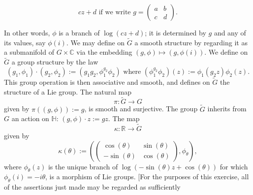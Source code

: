 \documentclass[reqno]{amsart} 
\begin{document}
\begin{homework}
\begin{enumerate}
\begin{itemize}
\begin{equation*}
        c z + d
        \text{ if we write }
        g = 
\begin{pmatrix}
          a & b \\
          c & d
        \end{pmatrix}
.
      \end{equation*}
    \end{itemize}
    In other words, $\phi$ is a branch of $\log(c z + d)$;
    it is determined by $g$ and any of its values, say $\phi(i)$.
    We may define on $\tilde{G}$ a smooth structure
    by regarding it as a submanifold of
    $G \times \mathbb{C}$
    via the embedding $(g,\phi) \mapsto (g,\phi(i))$.
    We define on $\tilde{G}$ a group structure
    by the law
    \begin{equation*}
      (g_1,\phi_1) \cdot (g_2,\phi_2)
      :=
      (g_1 g_2, \phi_1^{g_2} \phi_2)
      \text{ where }
      (\phi_1^{g_2} \phi_2)(z)
      :=
      \phi_1(g_2 z) \phi_2(z).
    \end{equation*}
    This group operation is then associative and smooth,
    and defines on $\tilde{G}$ the structure of a Lie group.
    The natural map
    \begin{equation*}
      \pi : \tilde{G} \rightarrow G
    \end{equation*}
    given by $\pi((g,\phi)) := g$,
    is smooth and surjective.
    The group $\tilde{G}$ inherits from $G$ an action on $\mathbb{H}$:
    $(g,\phi) \cdot z := g z$.
    The map
    \begin{equation*}
      \kappa : \mathbb{R} \rightarrow \tilde{G}
    \end{equation*}
    given
    by
    \begin{equation*}
      \kappa(\theta) :=
      (
      \begin{pmatrix}
        \cos(\theta) & \sin(\theta) \\
        -\sin(\theta) & \cos(\theta)
      \end{pmatrix}
,
      \phi_\theta),
    \end{equation*}
    where $\phi_\theta(z)$ is the unique branch
    of $\log(-\sin(\theta) z + \cos(\theta))$
    for which
    $\phi_\theta(i)
    = - i \theta$,
    is a morphism of Lie groups.
    [For the purposes of this exercise,
    all of the assertions just made may be regarded as sufficiently

\end{enumerate}
\end{homework}
\end{document}
